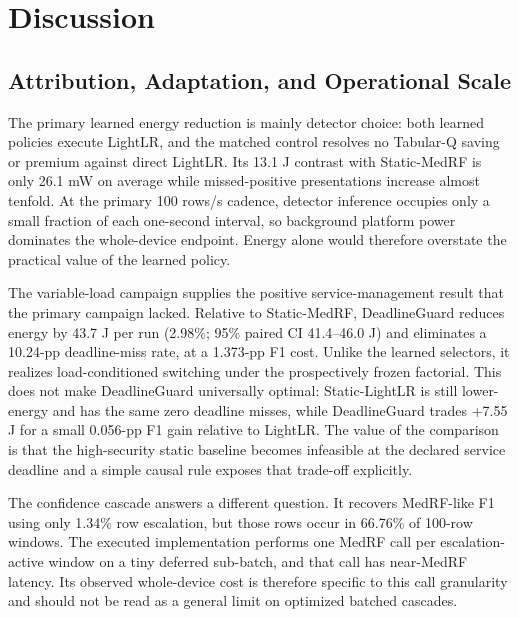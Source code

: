 \section{Discussion}
\subsection{Attribution, Adaptation, and Operational Scale}
The primary learned energy reduction is mainly detector choice: both learned policies execute LightLR, and the matched control resolves no Tabular-Q saving or premium against direct LightLR. Its 13.1 J contrast with Static-MedRF is only 26.1 mW on average while missed-positive presentations increase almost tenfold. At the primary 100 rows/s cadence, detector inference occupies only a small fraction of each one-second interval, so background platform power dominates the whole-device endpoint. Energy alone would therefore overstate the practical value of the learned policy.

The variable-load campaign supplies the positive service-management result that the primary campaign lacked. Relative to Static-MedRF, DeadlineGuard reduces energy by 43.7 J per run (2.98\%; 95\% paired CI 41.4--46.0 J) and eliminates a 10.24-pp deadline-miss rate, at a 1.373-pp F1 cost. Unlike the learned selectors, it realizes load-conditioned switching under the prospectively frozen factorial. This does not make DeadlineGuard universally optimal: Static-LightLR is still lower-energy and has the same zero deadline misses, while DeadlineGuard trades +7.55 J for a small 0.056-pp F1 gain relative to LightLR. The value of the comparison is that the high-security static baseline becomes infeasible at the declared service deadline and a simple causal rule exposes that trade-off explicitly.

The confidence cascade answers a different question. It recovers MedRF-like F1 using only 1.34\% row escalation, but those rows occur in 66.76\% of 100-row windows. The executed implementation performs one MedRF call per escalation-active window on a tiny deferred sub-batch, and that call has near-MedRF latency. Its observed whole-device cost is therefore specific to this call granularity and should not be read as a general limit on optimized batched cascades.

